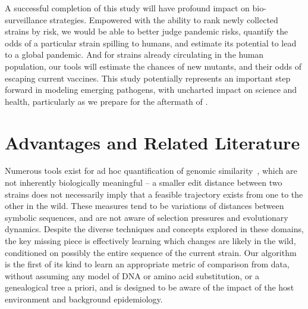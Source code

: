 \documentclass[onecolumn, compsoc,10pt]{IEEEtran}
\begin{document}
A successful completion of this study will have profound impact on  bio-surveillance strategies. Empowered with the ability to rank newly collected strains by risk, we would be able to better judge pandemic risks, quantify the odds of a particular strain spilling to humans, and estimate its potential to lead to a global pandemic. And for strains already circulating in the human population, our tools will estimate the chances of new mutants, and their odds of escaping current vaccines. This study potentially represents an important step forward in modeling emerging pathogens, with uncharted impact on science and health, particularly as we prepare for the aftermath of \cov.





\section*{\qnet Advantages and Related Literature}

Numerous tools exist for ad hoc quantification of genomic similarity~\cite{posada1998modeltest,goldberger2005genomic,huelsenbeck1997phylogeny,neher2014predicting,VanderMeer2010,Smith2009}, which are not inherently biologically meaningful -- a smaller edit distance between two strains does not necessarily imply that a feasible trajectory exists from one to the other in the wild. These measures tend to be  variations of distances between symbolic sequences, and are not aware of selection pressures and evolutionary dynamics. Despite the diverse techniques and concepts explored in these domains, the key missing piece is effectively learning which changes are likely in the wild, conditioned on possibly the entire sequence of the current strain. Our algorithm is the first of its kind to learn an appropriate metric of comparison from data, without assuming any model of DNA or amino acid substitution, or a genealogical tree a priori, and is  designed to be aware of the impact of the  host environment and background epidemiology.
\end{document}
